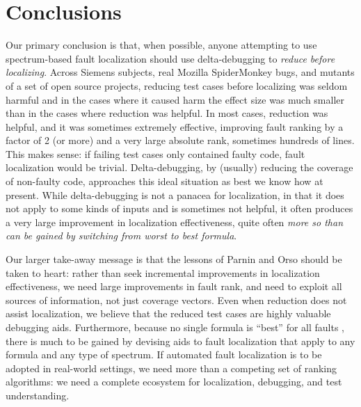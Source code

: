 \section{Conclusions}

Our primary conclusion is that, when possible, anyone attempting to
use spectrum-based fault localization should use delta-debugging to
\emph{reduce before localizing}.  Across Siemens subjects, real
Mozilla SpiderMonkey bugs, and mutants of a set of open source
projects, reducing test cases before localizing was seldom harmful and
in the cases where it caused harm the effect size was much smaller
than in the cases where reduction was helpful.  In most cases,
reduction was helpful, and it was sometimes extremely effective,
improving fault ranking by a factor of 2 (or more) and a very large
absolute rank, sometimes hundreds of lines. This makes sense: if
failing test cases only contained faulty code, fault localization
would be trivial.  Delta-debugging, by (usually) reducing the coverage
of non-faulty code, approaches this ideal situation as best we know
how at present.  While delta-debugging is not a panacea for
localization, in that it does not apply to some kinds of inputs and is
sometimes not helpful, it often produces a very large improvement in
localization effectiveness, quite often \emph{more so than can be
gained by switching from worst to best formula}.

Our larger take-away message is that the lessons of Parnin and Orso
\cite{AutoHelp} should be taken to heart: rather than seek incremental
improvements in localization effectiveness, we need large improvements
in fault rank, and need to exploit all sources of information, not
just coverage vectors.  Even when reduction does not assist
localization, we believe that the reduced test cases are highly
valuable debugging aids.  Furthermore, because no single formula is
``best'' for all faults \cite{yoo2014no}, there is much to be gained
by devising aids to fault localization that apply to any formula and
any type of spectrum.  If automated fault localization is to be
adopted in real-world settings, we need more than a competing set of
ranking algorithms: we need a complete ecosystem for localization, debugging,
and test understanding.
